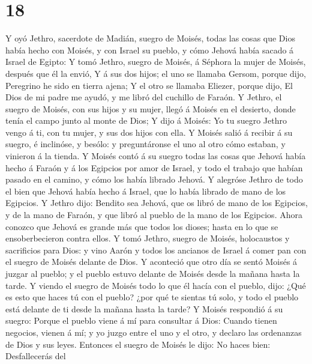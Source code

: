 \hypertarget{section-17}{%
\section{18}\label{section-17}}

 Y oyó Jethro, sacerdote de Madián, suegro de Moisés, todas
las cosas que Dios había hecho con Moisés, y con Israel su pueblo, y
cómo Jehová había sacado á Israel de Egipto:  Y tomó Jethro,
suegro de Moisés, á Séphora la mujer de Moisés, después que él la envió,
 Y á sus dos hijos; el uno se llamaba Gersom, porque dijo,
Peregrino he sido en tierra ajena;  Y el otro se llamaba
Eliezer, porque dijo, El Dios de mi padre me ayudó, y me libró del
cuchillo de Faraón.  Y Jethro, el suegro de Moisés, con sus
hijos y su mujer, llegó á Moisés en el desierto, donde tenía el campo
junto al monte de Dios;  Y dijo á Moisés: Yo tu suegro
Jethro vengo á ti, con tu mujer, y sus dos hijos con ella. 
Y Moisés salió á recibir á su suegro, é inclinóse, y besólo: y
preguntáronse el uno al otro cómo estaban, y vinieron á la tienda.
 Y Moisés contó á su suegro todas las cosas que Jehová había
hecho á Faraón y á los Egipcios por amor de Israel, y todo el trabajo
que habían pasado en el camino, y cómo los había librado Jehová.
 Y alegróse Jethro de todo el bien que Jehová había hecho á
Israel, que lo había librado de mano de los Egipcios.  Y
Jethro dijo: Bendito sea Jehová, que os libró de mano de los Egipcios, y
de la mano de Faraón, y que libró al pueblo de la mano de los Egipcios.
 Ahora conozco que Jehová es grande más que todos los
dioses; hasta en lo que se ensoberbecieron contra ellos.  Y
tomó Jethro, suegro de Moisés, holocaustos y sacrificios para Dios: y
vino Aarón y todos los ancianos de Israel á comer pan con el suegro de
Moisés delante de Dios.  Y aconteció que otro día se sentó
Moisés á juzgar al pueblo; y el pueblo estuvo delante de Moisés desde la
mañana hasta la tarde.  Y viendo el suegro de Moisés todo
lo que él hacía con el pueblo, dijo: ¿Qué es esto que haces tú con el
pueblo? ¿por qué te sientas tú solo, y todo el pueblo está delante de ti
desde la mañana hasta la tarde?  Y Moisés respondió á su
suegro: Porque el pueblo viene á mí para consultar á Dios: 
Cuando tienen negocios, vienen á mí; y yo juzgo entre el uno y el otro,
y declaro las ordenanzas de Dios y sus leyes.  Entonces el
suegro de Moisés le dijo: No haces bien:  Desfallecerás del
